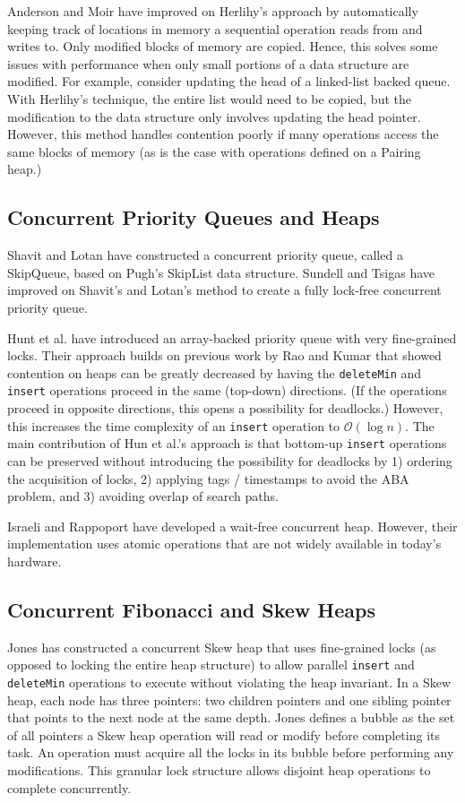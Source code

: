 \documentclass{acm_proc_article-sp}
\begin{document}
Anderson and Moir \cite{anderson99} have improved on Herlihy's approach by
automatically keeping track of locations in memory a sequential operation
reads from and writes to. Only modified blocks of memory are copied. Hence,
this solves some issues with performance when only small portions of a data
structure are modified. For example, consider updating the head of a linked-list backed queue.
With Herlihy's technique, the entire list would need to be copied, but the modification
to the data structure only involves updating the head pointer.
However, this method handles contention poorly if many operations
access the same blocks of memory (as is the case with operations defined on
a Pairing heap.)

\subsection{Concurrent Priority Queues and Heaps}
Shavit and Lotan have constructed \cite{shavit00}
a concurrent priority queue, called a SkipQueue,
based on Pugh's SkipList
\cite{pugh90} data structure.
Sundell and Tsigas \cite{sundell05} have improved on Shavit's
and Lotan's method to create a fully lock-free concurrent
priority queue.

Hunt et al. \cite{hunt96} have introduced an array-backed priority
queue with very fine-grained locks. Their approach
builds on previous work by Rao and Kumar
\cite{rao88} that showed contention on heaps can be greatly decreased
by having the \texttt{deleteMin} and \texttt{insert} operations proceed in
the same (top-down) directions. (If the operations proceed in opposite directions,
this opens a possibility for deadlocks.) However, this increases the
time complexity
of an \texttt{insert} operation to $\mathcal{O}(\log n)$.
The main contribution of Hun et al.'s
approach is that bottom-up \texttt{insert} operations
can be
preserved without introducing the possibility for deadlocks
by 1) ordering the acquisition of locks, 2) applying
tags / timestamps to avoid the ABA problem, and 3) avoiding overlap
of search paths.

Israeli and Rappoport have developed \cite{israeli93} a wait-free
concurrent heap. However, their implementation uses atomic operations
that are not widely available in today's hardware.

\subsection{Concurrent Fibonacci and Skew Heaps}
Jones \cite{jones89} has constructed a concurrent Skew heap that uses fine-grained
locks (as opposed to locking the entire heap structure) to allow parallel \texttt{insert} and \texttt{deleteMin} operations to execute
without violating the heap invariant. In a Skew heap, each node has three pointers:
two children pointers and one sibling pointer that points to the next node at the same
depth. Jones defines a bubble as the set of all pointers a Skew heap
operation will read or modify before completing its task. An operation must
acquire all the locks in its bubble before performing any modifications. This
granular lock structure allows disjoint heap operations to complete concurrently.
\end{document}
